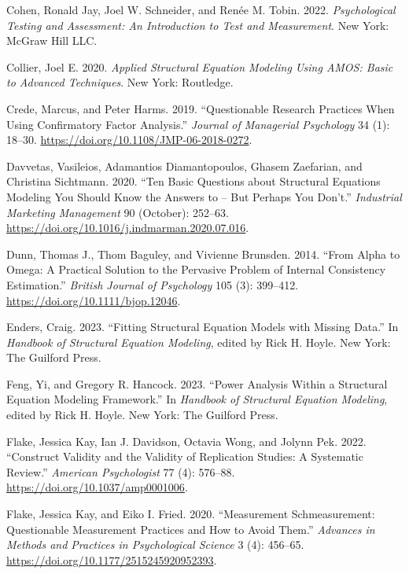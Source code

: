 \documentclass[
  a4paper,
]{article}
\newlength{\cslhangindent}
\newenvironment{CSLReferences}[2] %
 {\begin{list}{}{%
  \setlength{\itemindent}{0pt}
  \setlength{\leftmargin}{0pt}
  \setlength{\parsep}{0pt}
  \ifodd #1
   \setlength{\leftmargin}{\cslhangindent}
   \setlength{\itemindent}{-1\cslhangindent}
  \fi
  \setlength{\itemsep}{#2\baselineskip}}}
 {\end{list}}
\begin{document}
\begin{CSLReferences}{1}{0}
Cohen, Ronald Jay, Joel W. Schneider, and Renée M. Tobin. 2022.
\emph{Psychological {Testing} and {Assessment}: {An Introduction} to
{Test} and {Measurement}}. New York: McGraw Hill LLC.

Collier, Joel E. 2020. \emph{Applied {Structural Equation Modeling Using
AMOS}: {Basic} to {Advanced Techniques}}. New York: Routledge.

Crede, Marcus, and Peter Harms. 2019. {``Questionable Research Practices
When Using Confirmatory Factor Analysis.''} \emph{Journal of Managerial
Psychology} 34 (1): 18--30.
\url{https://doi.org/10.1108/JMP-06-2018-0272}.

Davvetas, Vasileios, Adamantios Diamantopoulos, Ghasem Zaefarian, and
Christina Sichtmann. 2020. {``Ten Basic Questions about Structural
Equations Modeling You Should Know the Answers to -- {But} Perhaps You
Don't.''} \emph{Industrial Marketing Management} 90 (October): 252--63.
\url{https://doi.org/10.1016/j.indmarman.2020.07.016}.

Dunn, Thomas J., Thom Baguley, and Vivienne Brunsden. 2014. {``From
Alpha to Omega: {A} Practical Solution to the Pervasive Problem of
Internal Consistency Estimation.''} \emph{British Journal of Psychology}
105 (3): 399--412. \url{https://doi.org/10.1111/bjop.12046}.

Enders, Craig. 2023. {``Fitting Structural {Equation Models} with
{Missing} Data.''} In \emph{Handbook of {Structural Equation Modeling}},
edited by Rick H. Hoyle. New York: The Guilford Press.

Feng, Yi, and Gregory R. Hancock. 2023. {``Power {Analysis} Within a
{Structural Equation Modeling Framework}.''} In \emph{Handbook of
{Structural Equation Modeling}}, edited by Rick H. Hoyle. New York: The
Guilford Press.

Flake, Jessica Kay, Ian J. Davidson, Octavia Wong, and Jolynn Pek. 2022.
{``Construct Validity and the Validity of Replication Studies: {A}
Systematic Review.''} \emph{American Psychologist} 77 (4): 576--88.
\url{https://doi.org/10.1037/amp0001006}.

Flake, Jessica Kay, and Eiko I. Fried. 2020. {``Measurement
{Schmeasurement}: {Questionable Measurement Practices} and {How} to
{Avoid Them}.''} \emph{Advances in Methods and Practices in
Psychological Science} 3 (4): 456--65.
\url{https://doi.org/10.1177/2515245920952393}.


\end{CSLReferences}
\end{document}
